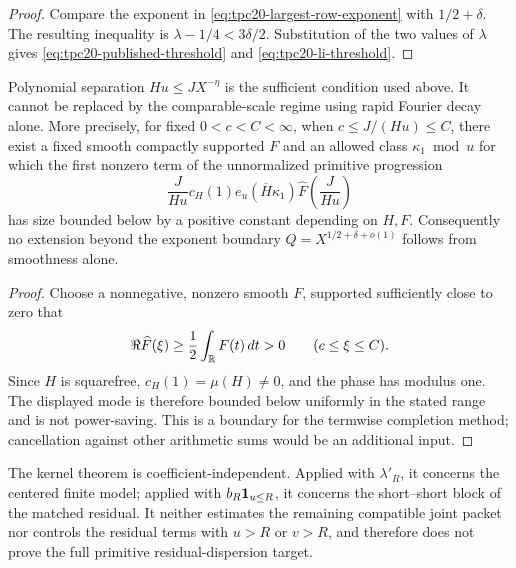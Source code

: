 \begin{proof}
Compare the exponent in \eqref{eq:tpc20-largest-row-exponent} with
\(1/2+\delta\).  The resulting inequality is
\(\lambda-1/4<3\delta/2\).  Substitution of the two values of
\(\lambda\) gives \eqref{eq:tpc20-published-threshold} and
\eqref{eq:tpc20-li-threshold}.
\end{proof}

\begin{proposition}
\label{prop:tpc20-single-boundary-nogo}
Polynomial separation \(Hu\le JX^{-\eta}\) is the sufficient condition
used above.  It cannot be replaced by the comparable-scale regime using
rapid Fourier decay alone.  More precisely, for fixed
\(0<c<C<\infty\), when
\(c\le J/(Hu)\le C\), there exist a fixed smooth compactly supported
\(F\) and an allowed class \(\kappa_1\bmod u\) for which the first
nonzero term of the unnormalized primitive progression
\begin{equation}
 \frac{J}{Hu}c_H(1)e_u(\overline H\kappa_1)
 \widehat F\!\left(\frac{J}{Hu}\right)
 \label{eq:tpc20-first-single-mode}
\end{equation}
has size bounded below by a positive constant depending on \(H,F\).
Consequently no extension beyond the exponent boundary
\(Q= X^{1/2+\delta+o(1)}\) follows from smoothness alone.
\end{proposition}

\begin{proof}
Choose a nonnegative, nonzero smooth \(F\), supported sufficiently close
to zero that
\[
 \Re\widehat F(\xi)\ge\frac12\int_{\mathbb R}F(t)\,dt>0
 \qquad(c\le\xi\le C).
\]
Since \(H\) is squarefree,
\(c_H(1)=\mu(H)\ne0\), and the phase has modulus one.  The displayed
mode is therefore bounded below uniformly in the stated range and is not
power-saving.  This is a boundary for the termwise completion method;
cancellation against other arithmetic sums would be an additional input.
\end{proof}

\begin{remark}[Scope]
\label{rem:tpc20-single-scope}
The kernel theorem is coefficient-independent.  Applied with
\(\lambda'_R\), it concerns the centered finite model; applied with
\(b_R\mathbf 1_{u\le R}\), it concerns the short--short block of the matched
residual.  It neither estimates the remaining compatible joint packet
nor controls the residual terms with \(u>R\) or \(v>R\), and therefore
does not prove the full primitive residual-dispersion target.
\end{remark}
